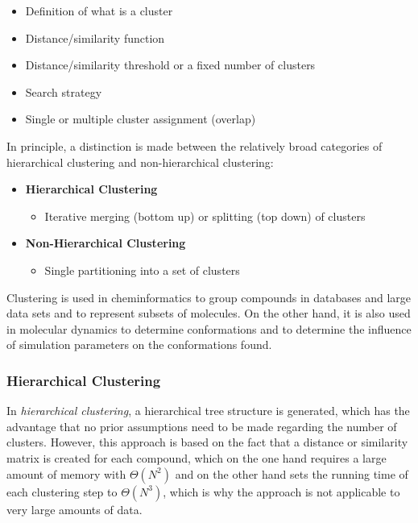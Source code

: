 \begin{itemize}
    \item Definition of what is a cluster
    \item Distance/similarity function
    \item Distance/similarity threshold or a fixed number of clusters
    \item Search strategy
    \item Single or multiple cluster assignment (overlap)
\end{itemize}

In principle, a distinction is made between the relatively broad categories of hierarchical clustering and non-hierarchical clustering:

\begin{itemize}
    \item \textbf{Hierarchical Clustering}
    \begin{itemize}
        \item Iterative merging (bottom up) or splitting (top down) of clusters
    \end{itemize}
    \item \textbf{Non-Hierarchical Clustering}
    \begin{itemize}
        \item Single partitioning into a set of clusters
    \end{itemize}
\end{itemize}

Clustering is used in cheminformatics to group compounds in databases and large data sets and to represent subsets of molecules. On the other hand, it is also used in molecular dynamics to determine conformations and to determine the influence of simulation parameters on the conformations found.

\subsubsection{Hierarchical Clustering}

In \emph{hierarchical clustering}, a hierarchical tree structure is generated, which has the advantage that no prior assumptions need to be made regarding the number of clusters. However, this approach is based on the fact that a distance or similarity matrix is created for each compound, which on the one hand requires a large amount of memory with $\Theta(N^2)$ and on the other hand sets the running time of each clustering step to $\Theta(N^3)$, which is why the approach is not applicable to very large amounts of data.

